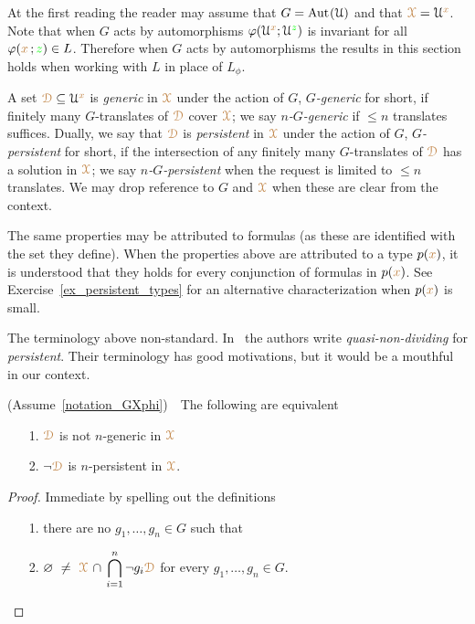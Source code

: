 At the first reading the reader may assume that $G={\rm Aut\kern.15ex}(\EuScript U)$ and that ${\color{brown}\EuScript X}=\EuScript U^{\color{brown} x}$.
Note that when $G$ acts by automorphisms $\varphi(\EuScript U^{\color{brown} x};\EuScript U^{\color{green} z})$ is invariant for all $\varphi({\color{brown} x}\,;{\color{green} z})\in L$.
Therefore when $G$ acts by automorphisms the results in this section holds when working with $L$ in place of $L_\phi$.

A set ${\color{brown}\EuScript D}\subseteq\EuScript U^{\color{brown} x}$ is \emph{generic\/} in ${\color{brown}\EuScript X}$ under the action of $G$, \emph{$G$-generic\/} for short, if finitely many $G$-translates of ${\color{brown}\EuScript D}$ cover ${\color{brown}\EuScript X}$; we say \emph{$n$-$G$-generic\/} if $\le n$ translates suffices.
Dually, we say that ${\color{brown}\EuScript D}$ is \emph{persistent\/} in ${\color{brown}\EuScript X}$ under the action of $G$, \emph{$G$-persistent\/} for short, if the intersection of any finitely many $G$-translates of ${\color{brown}\EuScript D}$ has a solution in ${\color{brown}\EuScript X}$; we say \emph{$n$-$G$-persistent\/} when the request is limited to $\le n$ translates.
We may drop reference to $G$ and ${\color{brown}\EuScript X}$ when these are clear from the context.

The same properties may be attributed to formulas (as these are identified with the set they define).
When the properties above are attributed to a type $p({\color{brown} x})$, it is understood that they holds for every conjunction of formulas in $p({\color{brown} x})$.
See Exercise~\ref{ex_persistent_types} for an alternative characterization when $p({\color{brown} x})$ is small.

\noindent\llap{\textcolor{red}{\Large\warning}\kern1.5ex}\ignorespaces
The terminology above non-standard.
In~\cite{CK} the authors write \textit{quasi-non-dividing\/} for \textit{persistent}.
Their terminology has good motivations, but it would be a mouthful in our context.

\begin{fact}\label{fact_fip}
  (Assume~\ref{notation_GXphi})\ \  
  The following are equivalent
  \begin{itemize}
    \item[1.] ${\color{brown}\EuScript D}$ is not $n$-generic in ${\color{brown}\EuScript X}$
    \item[2.] $\neg{\color{brown}\EuScript D}$ is $n$-persistent in ${\color{brown}\EuScript X}$.
  \end{itemize}
\end{fact}

\begin{proof}
  Immediate by spelling out the definitions\smallskip
  \begin{itemize}
    \item[1.] there are no $g_1,\dots,g_n\in G$ such that 
    \item[2.]  $\displaystyle\0\ \neq\ \mrX\,\cap\,\bigcap_{i=1}^n\neg g_i{\mr\D}$ for every $g_1,\dots,g_n\in G$.\qedhere
  \end{itemize} 
\end{proof}


